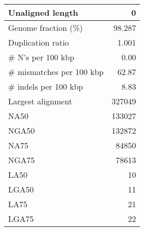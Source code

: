 \documentclass[12pt,a4paper]{article}
\begin{document}
\begin{table}[ht]
\begin{center}
\begin{tabular}{|l*{1}{|r}|}
Unaligned length & 0 \\ \hline
Genome fraction (\%) & 98.287 \\ \hline
Duplication ratio & 1.001 \\ \hline
\# N's per 100 kbp & 0.00 \\ \hline
\# mismatches per 100 kbp & 62.87 \\ \hline
\# indels per 100 kbp & 8.83 \\ \hline
Largest alignment & 327049 \\ \hline
NA50 & 133027 \\ \hline
NGA50 & 132872 \\ \hline
NA75 & 84850 \\ \hline
NGA75 & 78613 \\ \hline
LA50 & 10 \\ \hline
LGA50 & 11 \\ \hline
LA75 & 21 \\ \hline
LGA75 & 22 \\ \hline
\end{tabular}
\end{center}
\end{table}
\end{document}

